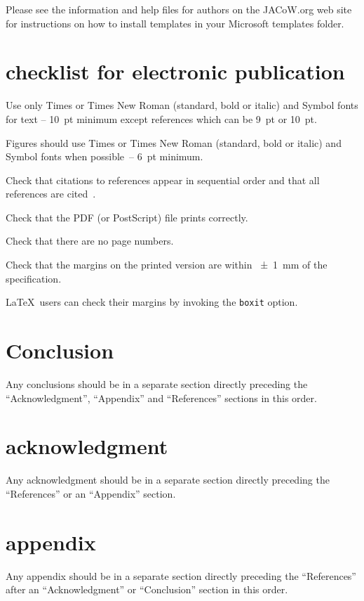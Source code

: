 \documentclass[acus]{jacow}
\begin{document}
Please see the information and help files for authors on the JACoW.org web site
for instructions  on  how to install templates in your Microsoft templates folder.



\section{checklist for electronic publication}

\begin{Itemize}
    \item  Use only Times or Times New Roman (standard, bold or italic) and Symbol
           fonts for text -- \SI{10}{pt} minimum except references which can be \SI{9}{pt} or \SI{10}{pt}.
    \item  Figures should use Times or Times New Roman (standard, bold or italic) and
           Symbol fonts when possible~-- \SI{6}{pt} minimum.
    \item  Check that citations to references appear in sequential order and
           that all references are cited~\cite{exampl-ref11}.
    \item  Check that the PDF (or PostScript) file prints correctly.
    \item  Check that there are no page numbers.
    \item  Check that the margins on the printed version are within \SI{\pm1}{mm}
           of the specification.
    \item  \LaTeX\ users can check their margins by invoking the
           \texttt{boxit} option.
\end{Itemize}

\section{Conclusion}

Any conclusions should be in a separate section directly preceding
the \enquote{Acknowledgment}, \enquote{Appendix} and \enquote{References} sections in this
order.

\section{acknowledgment}
Any acknowledgment should be in a separate section directly preceding
the \enquote{References} or an \enquote{Appendix} section.

\section{appendix}
Any appendix should be in a separate section directly preceding
the \enquote{References} after an \enquote{Acknowledgment} or \enquote{Conclusion} section
in this order.
\end{document}
